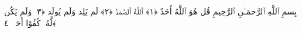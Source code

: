 
  
    
  
    
    

\nopagebreak
  بِسمِ ٱللَّهِ ٱلرَّحمَـٰنِ ٱلرَّحِيمِ
  قُل هُوَ ٱللَّهُ أَحَدٌ ﴿١﴾
 ٱللَّهُ ٱلصَّمَدُ ﴿٢﴾
 لَم يَلِد وَلَم يُولَد ﴿٣﴾
 وَلَم يَكُن لَّهُۥ كُفُوًا أَحَدٌۢ ﴿٤﴾
 
